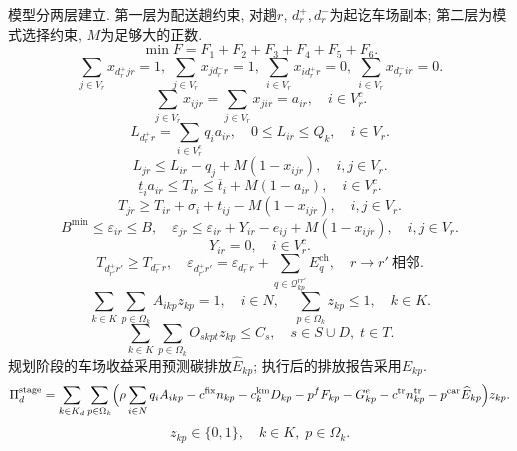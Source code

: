 \documentclass{setp-new}
\begin{document}
模型分两层建立. 第一层为配送趟约束, 对趟$r$, $d_r^+,d_r^-$为起讫车场副本; 第二层为模式选择约束, $M$为足够大的正数.
\begin{equation}
\min F=F_1+F_2+F_3+F_4+F_5+F_6. \label{eq:obj}
\end{equation}
\begin{equation}
\sum_{j\in V_r}x_{d_r^+jr}=1,\ \sum_{j\in V_r}x_{jd_r^-r}=1,\ \sum_{i\in V_r}x_{id_r^+r}=0,\ \sum_{i\in V_r}x_{d_r^-ir}=0.
\label{eq:trip_flow}
\end{equation}
\begin{equation}
\sum_{j\in V_r}x_{ijr}=\sum_{j\in V_r}x_{jir}=a_{ir},\quad i\in V_r^c.
\label{eq:flow_cons}
\end{equation}
\begin{equation}
L_{d_r^+r}=\sum_{i\in V_r^c}q_i a_{ir},\quad 0\le L_{ir}\le Q_k,\quad i\in V_r.
\label{eq:load_bounds}
\end{equation}
\begin{equation}
L_{jr}\le L_{ir}-q_j+M(1-x_{ijr}),\quad i,j\in V_r.
\label{eq:load_prop}
\end{equation}
\begin{equation}
\underline t_i a_{ir}\le T_{ir}\le\overline t_i+M(1-a_{ir}),\quad i\in V_r^c.
\label{eq:tw}
\end{equation}
\begin{equation}
T_{jr}\ge T_{ir}+\sigma_i+t_{ij}-M(1-x_{ijr}),\quad i,j\in V_r.
\label{eq:time_prop}
\end{equation}
\begin{equation}
B^{\min}\le\varepsilon_{ir}\le B,\quad
\varepsilon_{jr}\le\varepsilon_{ir}+Y_{ir}-e_{ij}+M(1-x_{ijr}),\quad i,j\in V_r.
\label{eq:batt_prop}
\end{equation}
\begin{equation}
Y_{ir}=0,\quad i\in V_r^c.
\label{eq:no_customer_charge}
\end{equation}
\begin{equation}
T_{d_{r'}^+r'}\ge T_{d_r^-r},\quad
\varepsilon_{d_{r'}^+r'}=\varepsilon_{d_r^-r}+\sum_{q\in\mathcal Q_{kp}^{rr'}}E_q^{\mathrm{ch}},\quad r\to r'\ \text{相邻}.
\label{eq:trip_linkage}
\end{equation}
\begin{equation}
\sum_{k\in K}\sum_{p\in\Omega_k}A_{ikp}z_{kp}=1,\quad i\in N,\quad
\sum_{p\in\Omega_k}z_{kp}\le1,\quad k\in K.
\label{eq:coverage}
\end{equation}
\begin{equation}
\sum_{k\in K}\sum_{p\in\Omega_k}O_{skpt}z_{kp}\le C_s,\quad s\in S\cup D,\;t\in T.
\label{eq:station_cap}
\end{equation}
规划阶段的车场收益采用预测碳排放$\widehat E_{kp}$; 执行后的排放报告采用$E_{kp}$.
\begin{equation}
\Pi_d^{\mathrm{stage}}=\sum_{k\in K_d}\sum_{p\in\Omega_k}
\Bigl(\rho\sum_{i\in N}q_iA_{ikp}
-c^{\mathrm{fix}}n_{kp}-c_k^{\mathrm{km}}D_{kp}-p^fF_{kp}-G_{kp}^{e}
-c^{\mathrm{tr}}n_{kp}^{\mathrm{tr}}-p^{\mathrm{car}}\widehat E_{kp}\Bigr)z_{kp}.
\label{eq:stage_profit}
\end{equation}
\begin{equation}
z_{kp}\in\{0,1\},\quad k\in K,\;p\in\Omega_k.
\label{eq:binary}
\end{equation}
\end{document}
